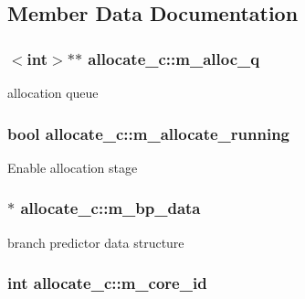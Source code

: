 \subsection{Member Data Documentation}
\hypertarget{classallocate__c_a39e15f51ece384c7db2d3225d57e2d74}{
\subsubsection[{m\_\-alloc\_\-q}]{$<$int$>$$\ast$$\ast$ {\bf allocate\_\-c::m\_\-alloc\_\-q}}}
\label{classallocate__c_a39e15f51ece384c7db2d3225d57e2d74}
allocation queue \hypertarget{classallocate__c_a263d672e86ddc35adf16aa139c762210}{
\subsubsection[{m\_\-allocate\_\-running}]{\setlength{\rightskip}{0pt plus 5cm}bool {\bf allocate\_\-c::m\_\-allocate\_\-running}}}
\label{classallocate__c_a263d672e86ddc35adf16aa139c762210}
Enable allocation stage \hypertarget{classallocate__c_a2565b35de756da5bec94b3a533593097}{
\subsubsection[{m\_\-bp\_\-data}]{$\ast$ {\bf allocate\_\-c::m\_\-bp\_\-data}}}
\label{classallocate__c_a2565b35de756da5bec94b3a533593097}
branch predictor data structure \hypertarget{classallocate__c_a15027f8e994b1f1a92ced957c0e0d3a0}{
\subsubsection[{m\_\-core\_\-id}]{\setlength{\rightskip}{0pt plus 5cm}int {\bf allocate\_\-c::m\_\-core\_\-id}}}
